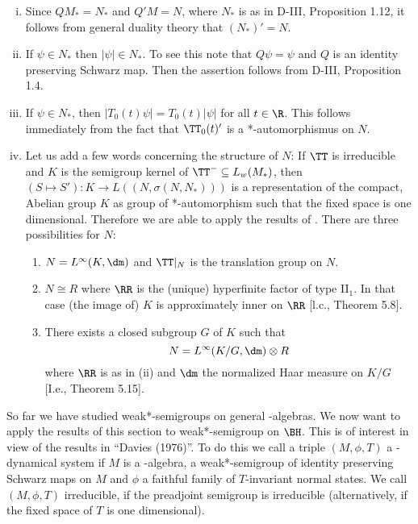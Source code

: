 \begin{remarks}\label{rem:d4-3.6}
\begin{enumerate}[(i), wide]
\item
Since $QM_{*} = N_{*}$ and $Q'M = N$, where $N_{*}$ is as in D-III, Proposition 1.12, it follows from general duality theory that $(N_{*})' = N$.

\item
If $\psi \in N_{*}$ then $|\psi| \in N_{*}$.
To see this note that $Q\psi = \psi$ and $Q$ is an identity preserving Schwarz map.
Then the assertion follows from D-III, Proposition 1.4.

\item
If $\psi \in N_{*}$, then $|T_{0}(t)\psi| = T_{0}(t)|\psi|$ for all $t \in \R$.
This follows immediately from the fact that $\TT_{0}(t)'$ is a *-automorphismus on $N$.

\item
Let us add a few words concerning the structure of $N$: If $\TT$ is irreducible and $K$ is the semigroup kernel of $\TT^{-} \subseteq L_{w}(M_{*})$, then $(S \mapsto S'): K \to L((N,\sigma(N,N_{*})))$ is a representation of the compact, Abelian group $K$ as group of *-automorphism such that the fixed space is one dimensional.
Therefore we are able to apply the results of \citet{olesenpedersentakesaki:1980}.
There are three possibilities for $N$:

\begin{enumerate}[1.]
\item
$N = L^{\infty}(K,\dm)$ and $\TT|_{N}$ is the translation group on $N$.

\item
$N \cong R$ where $\RR$ is the (unique) hyperfinite factor of type II$_{1}$.
In that case (the image of) $K$ is approximately inner on $\RR$ [l.c., Theorem 5.8].


\item
There exists a closed subgroup $ G $  of $ K $  such that
\[
N = L^{\infty}(K/G, \dm) \otimes R
\]
where $ \RR $  is as in (ii) and $ \dm $  the normalized Haar measure on $ K/G $  [I.e., Theorem 5.15].
\end{enumerate}
\end{enumerate}
\end{remarks}
So far we have studied weak*-semigroups on general \WA-algebras.
We now want to apply the results of this section to weak*-semigroup on $ \BH $.
This is of interest in view of the results in \enquote{Davies (1976)}.
To do this we call a triple $ (M,\phi,T) $  a \WA-dynamical system if $ M $  is a \WA-algebra, a weak*-semigroup of identity preserving Schwarz maps on $ M $  and $ \phi $  a faithful family of $ T $-invariant normal states.
We call $ (M,\phi,T) $  irreducible, if the preadjoint semigroup is irreducible (alternatively, if the fixed space of $ T $  is one dimensional).

